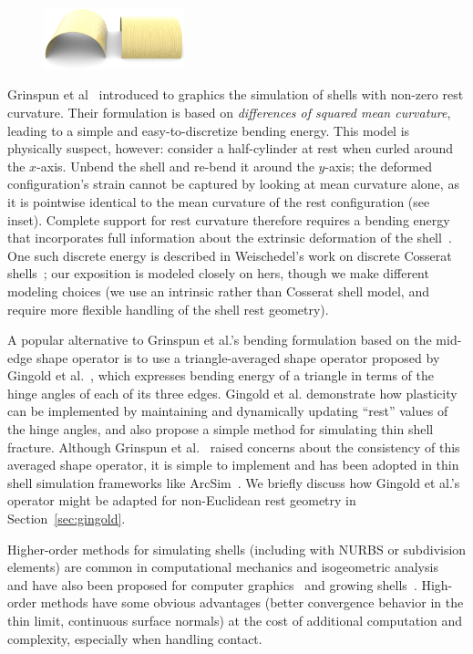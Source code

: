 \documentclass[timestamp,acmtog]{acmart}
\begin{document}
\begin{figure}
\centering
\includegraphics[width=1.6in]{cyls.png}
\label{fig:cyls}
\end{figure}
Grinspun et al~ introduced to graphics the simulation of shells with non-zero rest curvature. Their formulation is based on \emph{differences of squared mean curvature}, leading to a simple and easy-to-discretize bending energy. This model is physically suspect, however: consider a half-cylinder at rest when curled around the $x$-axis. Unbend the shell and re-bend it around the $y$-axis; the deformed configuration's strain cannot be captured by looking at mean curvature alone, as it is pointwise identical to the mean curvature of the rest configuration (see inset). Complete support for rest curvature therefore requires a bending energy that incorporates full information about the extrinsic deformation of the shell~\cite{Grinspun2006}. One such discrete energy is described in Weischedel's work on discrete Cosserat shells~; our exposition is modeled closely on hers, though we make different modeling choices (we use an intrinsic rather than Cosserat shell model, and require more flexible handling of the shell rest geometry).

A popular alternative to Grinspun et al.'s bending formulation based on the mid-edge shape operator is to use a triangle-averaged shape operator proposed by Gingold et al.~, which expresses bending energy of a triangle in terms of the hinge angles of each of its three edges. Gingold et al. demonstrate how plasticity can be implemented by maintaining and dynamically updating ``rest'' values of the hinge angles, and also propose a simple method for simulating thin shell fracture. Although Grinspun et al.~ raised concerns about the consistency of this averaged shape operator, it is simple to implement and has been adopted in thin shell simulation frameworks like ArcSim~\cite{Narain2013}. We briefly discuss how Gingold et al.'s operator might be adapted for non-Euclidean rest geometry in Section~\ref{sec:gingold}.

Higher-order methods for simulating shells (including with NURBS or subdivision elements) are common in computational mechanics and isogeometric analysis~\cite{Batoz1980,Bathe1983,Cirak2000,Kiendl2009,Benson2010,Bandara2018} and have also been proposed for computer graphics~\cite{Wawrzinek2011} and growing shells~\cite{Vetter13}. High-order methods have some obvious advantages (better convergence behavior in the thin limit, continuous surface normals) at the cost of additional computation and complexity, especially when handling contact.
\end{document}
